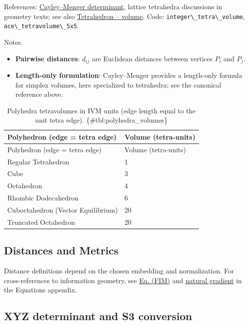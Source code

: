 \documentclass[
  10pt,
]{article}
\newcommand{\passthrough}[1]{#1}
\providecommand{\tightlist}{%
  \setlength{\itemsep}{0pt}\setlength{\parskip}{0pt}}
\begin{document}
References:
\href{https://en.wikipedia.org/wiki/Cayley\%E2\%80\%93Menger_determinant}{Cayley--Menger
determinant}, lattice tetrahedra discussions in geometry texts; see also
\href{https://en.wikipedia.org/wiki/Tetrahedron\#Volume}{Tetrahedron --
volume}. Code: \passthrough{\lstinline!integer\_tetra\_volume!},
\passthrough{\lstinline!ace\_tetravolume\_5x5!}.

Notes.

\begin{itemize}
\tightlist
\item
  \textbf{Pairwise distances}: \(d_{ij}\) are Euclidean distances
  between vertices \(P_i\) and \(P_j\).
\item
  \textbf{Length-only formulation}: Cayley--Menger provides a
  length-only formula for simplex volumes, here specialized to
  tetrahedra; see the canonical reference above.
\end{itemize}

\begin{longtable}[]{@{}ll@{}}
\caption{Polyhedra tetravolumes in IVM units (edge length equal to the
unit tetra edge). \{\#tbl:polyhedra\_volumes\}}\tabularnewline
\toprule
Polyhedron (edge = tetra edge) & Volume (tetra-units)\tabularnewline
\midrule
\endfirsthead
\toprule
Polyhedron (edge = tetra edge) & Volume (tetra-units)\tabularnewline
\midrule
\endhead
Regular Tetrahedron & 1\tabularnewline
Cube & 3\tabularnewline
Octahedron & 4\tabularnewline
Rhombic Dodecahedron & 6\tabularnewline
Cuboctahedron (Vector Equilibrium) & 20\tabularnewline
Truncated Octahedron & 20\tabularnewline
\bottomrule
\end{longtable}

\hypertarget{distances-and-metrics}{%
\subsection{Distances and Metrics}\label{distances-and-metrics}}

Distance definitions depend on the chosen embedding and normalization.
For cross-references to information geometry, see
\href{08_equations_appendix.md\#eq:fim}{Eq. (FIM)} and
\href{08_equations_appendix.md\#eq:natgrad}{natural gradient} in the
Equations appendix.

\hypertarget{sec:xyz_conversion}{%
\subsection{XYZ determinant and S3
conversion}\label{sec:xyz_conversion}}
\end{document}

